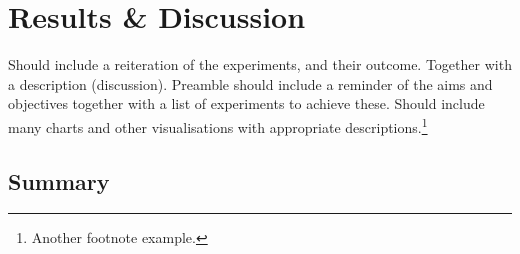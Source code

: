 \chapter{Results \& Discussion}

Should include a reiteration of the experiments, and their outcome.
Together with a description (discussion).
Preamble should include a reminder of the aims and objectives together with a list of experiments to achieve these.
Should include many charts and other visualisations with appropriate descriptions.\footnote{Another footnote example.}

\blindtext

\section{Summary}

\blindtext
